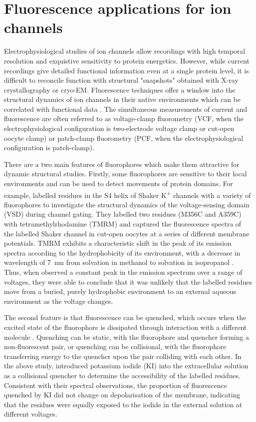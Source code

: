 \section{Fluorescence applications for ion channels}

Electrophysiological studies of ion channels allow recordings with high temporal resolution and exquistive sensitivity to protein energetics.
However, while current recordings give detailed functional information even at a single protein level, it is difficult to reconcile function with structural "snapshots" obtained with X-ray crystallography or cryo-EM.
Fluorescence techniques offer a window into the structural dynamics of ion channels in their native environments which can be correlated with functional data \cite{zheng_handbook_2015}.
The simultaneous measurements of current and fluorescence are often referred to as voltage-clamp fluorometry (VCF, when the electrophysiological configuration is two-electrode voltage clamp or cut-open oocyte clamp) or patch-clamp fluorometry (PCF, when the electrophysiological configuration is patch-clamp).

There are a two main features of fluorophores which make them attractive for dynamic structural studies.
Firstly, some fluorophores are sensitive to their local environments and can be used to detect movements of protein domains.
For example, \citeauthor{cha_characterizing_1997} labelled residues in the S4 helix of Shaker K\textsuperscript{+} channels with a variety of fluorophores to investigate the structural dynamics of the voltage-sensing domain (VSD) during channel gating.
They labelled two residues (M356C and A359C) with tetramethylrhodamine (TMRM) and captured the fluorescence spectra of the labelled Shaker channel in cut-open oocytes at a series of different membrane potentials.
TMRM exhibits a characteristic shift in the peak of its emission spectra according to the hydrophobicity of its environment, with a decrease in wavelength of \SI{7}{\nano\metre} from solvation in methanol to solvation in isopropanol \cite{cha_characterizing_1997}.
Thus, when \citeauthor{cha_characterizing_1997} observed a constant peak in the emission spectrum over a range of voltages, they were able to conclude that it was unlikely that the labelled residues move from a buried, purely hydrophobic environment to an external aqueous environment as the voltage changes.

The second feature is that fluorescence can be quenched, which occurs when the excited state of the fluorophore is dissipated through interaction with a different molecule \cite{zheng_handbook_2015}.
Quenching can be static, with the fluorophore and quencher forming a non-fluorescent pair, or quenching can be collisional, with the fluorophore transferring energy to the quencher upon the pair colliding with each other.
In the above study, \citeauthor{cha_characterizing_1997} introduced potassium iodide (KI) into the extracellular solution as a collisional quencher to determine the accessibility of the labelled residues.
Consistent with their spectral observations, the proportion of fluorescence quenched by KI did not change on depolarisation of the membrane, indicating that the residues were equally exposed to the iodide in the external solution at different voltages.

